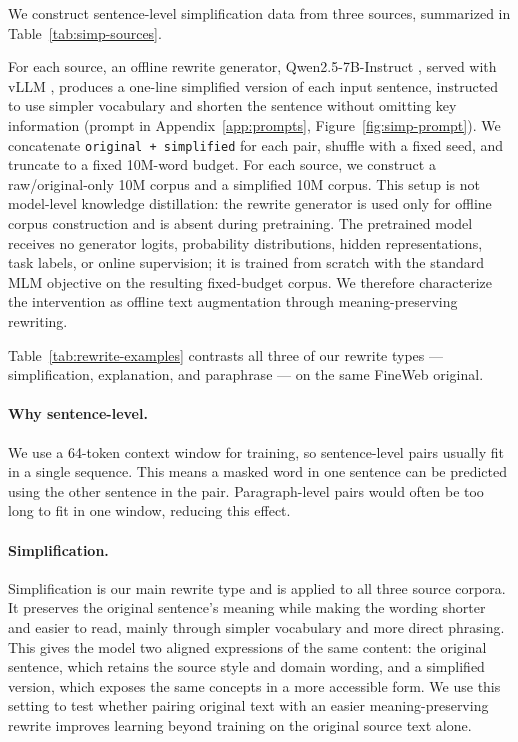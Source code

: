 \documentclass[11pt]{article}
\begin{document}
We construct sentence-level simplification data from three sources, summarized in Table~\ref{tab:simp-sources}.

For each source, an offline rewrite generator, Qwen2.5-7B-Instruct \citep{qwen2024qwen25}, served with vLLM \citep{kwon2023vllm}, produces a one-line simplified version of each input sentence, instructed to use simpler vocabulary and shorten the sentence without omitting key information (prompt in Appendix~\ref{app:prompts}, Figure~\ref{fig:simp-prompt}). We concatenate \texttt{original + simplified} for each pair, shuffle with a fixed seed, and truncate to a fixed 10M-word budget. For each source, we construct a raw/original-only 10M corpus and a simplified 10M corpus. This setup is not model-level knowledge distillation: the rewrite generator is used only for offline corpus construction and is absent during pretraining. The pretrained model receives no generator logits, probability distributions, hidden representations, task labels, or online supervision; it is trained from scratch with the standard MLM objective on the resulting fixed-budget corpus. We therefore characterize the intervention as offline text augmentation through meaning-preserving rewriting.

Table~\ref{tab:rewrite-examples} contrasts all three of our rewrite types --- simplification, explanation, and paraphrase --- on the same FineWeb original.

\paragraph{Why sentence-level.} We use a 64-token context window for training, so sentence-level pairs usually fit in a single sequence. This means a masked word in one sentence can be predicted using the other sentence in the pair. Paragraph-level pairs would often be too long to fit in one window, reducing this effect.

\paragraph{Simplification.} Simplification is our main rewrite type and is applied to all three source corpora. It preserves the original sentence's meaning while making the wording shorter and easier to read, mainly through simpler vocabulary and more direct phrasing. This gives the model two aligned expressions of the same content: the original sentence, which retains the source style and domain wording, and a simplified version, which exposes the same concepts in a more accessible form. We use this setting to test whether pairing original text with an easier meaning-preserving rewrite improves learning beyond training on the original source text alone.
\end{document}

